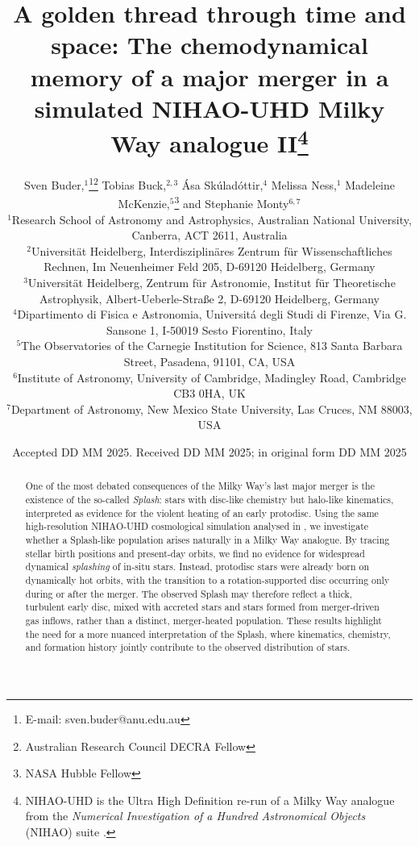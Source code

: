 \documentclass[fleqn,usenatbib]{mnras}
\title[A golden thread through time and space II]{A golden thread through time and space: The chemodynamical memory of a major merger in a simulated NIHAO-UHD Milky Way analogue II\thanks{NIHAO-UHD is the Ultra High Definition re-run of a Milky Way analogue from the \textit{Numerical Investigation of a Hundred Astronomical Objects} (NIHAO) suite \citep{Wang2015}.}}
\author[S. Buder et al.]{Sven Buder,$^{1}$\thanks{E-mail: sven.buder@anu.edu.au}\thanks{Australian Research Council DECRA Fellow}\orcidlink{0000-0002-4031-8553}
Tobias Buck,$^{2,3}$\orcidlink{0000-0003-2027-399X}
Ása Skúladóttir,$^{4}$\orcidlink{0000-0001-9155-9018}
Melissa Ness,$^{1}$\orcidlink{0000-0001-5082-6693}
Madeleine McKenzie,$^{5}$\thanks{NASA Hubble Fellow}\orcidlink{0000-0002-1715-1257}
and\newauthor
Stephanie Monty$^{6, 7}$\orcidlink{0000-0002-9225-5822}
\\
$^{1}$Research School of Astronomy and Astrophysics, Australian National University, Canberra, ACT 2611, Australia\\
$^{2}$Universit{\"a}t Heidelberg, Interdisziplin{\"a}res Zentrum f{\"u}r Wissenschaftliches Rechnen, Im Neuenheimer Feld 205, D-69120 Heidelberg, Germany\\
$^{3}$Universit{\"a}t Heidelberg, Zentrum f{\"u}r Astronomie, Institut f{\"u}r Theoretische Astrophysik, Albert-Ueberle-Straße 2, D-69120 Heidelberg, Germany\\
$^{4}$Dipartimento di Fisica e Astronomia, Universitá degli Studi di Firenze, Via G. Sansone 1, I-50019 Sesto Fiorentino, Italy\\
$^{5}$The Observatories of the Carnegie Institution for Science, 813 Santa Barbara Street, Pasadena, 91101, CA, USA\\
$^{6}$Institute of Astronomy, University of Cambridge, Madingley Road, Cambridge CB3 0HA, UK\\
$^{7}$Department of Astronomy, New Mexico State University, Las Cruces, NM 88003, USA
}
\date{Accepted DD MM 2025. Received DD MM 2025; in original form DD MM 2025}
\begin{document}
\label{firstpage}
\pagerange{\pageref{firstpage}--\pageref{lastpage}}
\maketitle

\begin{abstract} %
One of the most debated consequences of the Milky Way’s last major merger is the existence of the so-called \textit{Splash}: stars with disc-like chemistry but halo-like kinematics, interpreted as evidence for the violent heating of an early protodisc. Using the same high-resolution NIHAO-UHD cosmological simulation analysed in , we investigate whether a Splash-like population arises naturally in a Milky Way analogue. By tracing stellar birth positions and present-day orbits, we find no evidence for widespread dynamical \textit{splashing} of in-situ stars. Instead, protodisc stars were already born on dynamically hot orbits, with the transition to a rotation-supported disc occurring only during or after the merger. The observed Splash may therefore reflect a thick, turbulent early disc, mixed with accreted stars and stars formed from merger-driven gas inflows, rather than a distinct, merger-heated population. These results highlight the need for a more nuanced interpretation of the Splash, where kinematics, chemistry, and formation history jointly contribute to the observed distribution of stars.
\end{abstract}
\end{document}

